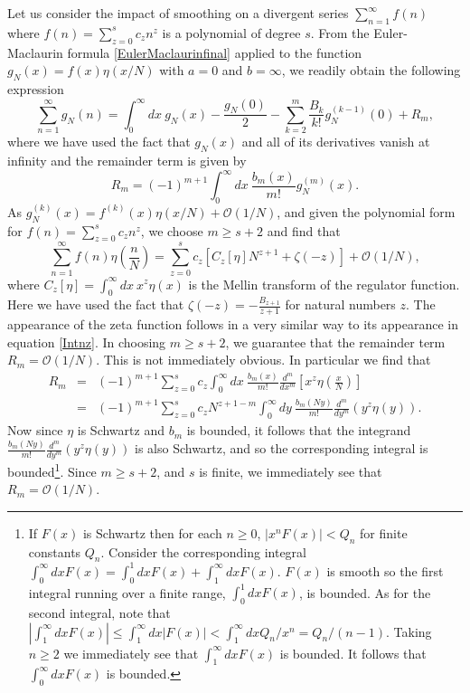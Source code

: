 \documentclass[11pt, letter]{article}
\def\be{\begin{equation}}
\def\ee{\end{equation}}
\begin{document}
Let us consider the impact of smoothing on a divergent series $\sum_{n=1}^\infty f(n)$ where $f(n)=\sum_{z=0}^s c_z n^z$ is a polynomial of degree  $s$. From the Euler-Maclaurin formula \eqref{EulerMaclaurinfinal} applied to the function $g_N(x)=f(x)\eta(x/N)$ with $a=0$ and $b=\infty$, we readily obtain the following expression
\begin{equation}\label{EM}
\sum_{n=1}^\infty g_N(n)= \int^\infty_0 dx \ g_N(x) - \frac{g_N(0)}{2}- \sum \limits_{k=2}^{m}  \frac{B_{k}}{k!} g_N^{(k-1)} (0)+ R_m,
\end{equation}
where we have used the fact that $g_N(x)$ and all of its derivatives vanish at infinity and the remainder term is given by 
\be
R_m= (-1)^{m+1} \int^\infty_0 dx \ \frac{b_{m}(x)}{m!} g_N^{(m)}(x).
\ee
As $g_N^{(k)}(x)=f^{(k)}(x)\eta(x/N)+\mathcal{O}(1/N)$, and given the polynomial form for $f(n)=\sum_{z=0}^s c_z n^z$, we choose $m \geq s+2$ and find that
\begin{equation}\label{EM2}
\sum_{n=1}^\infty f(n)\eta\left(\frac{n}{N}\right)= \sum_{z=0}^s c_z \left[C_{z}[\eta]   N^{z+1} +\zeta(-z)\right]+\mathcal{O}(1/N),
\end{equation}
where  $C_{z}[\eta] =\int_0^\infty dx  \ x^z \eta(x)$ is the Mellin transform of the regulator function. Here we have used the fact that $\zeta(-z)=-\frac{B_{z+1}}{z+1}$ for natural numbers $z$. The appearance of the zeta function follows in a very similar way to its appearance in equation \eqref{Intnz}. In choosing $m \geq s+2$, we guarantee that the remainder term $R_m =\mathcal{O}(1/N)$.  This is not immediately obvious. In particular we find that 
\begin{eqnarray}
R_{m} &=& (-1)^{m+1}  \sum_{z=0}^s c_z  \int^\infty_0 dx \ \frac{b_{m}(x)}{m!} \frac{d^m}{d x^m} \left[  x^z   \eta\left(\frac{x}{N}\right)\right] \\
&=& (-1)^{m+1}  \sum_{z=0}^s c_z  N^{z+1-m} \int^\infty_0 dy \ \frac{b_{m}(Ny)}{m!} \frac{d^m}{d y^m} (  y^z   \eta\left(y\right)).
\end{eqnarray}
Now since $\eta$ is Schwartz and $b_m$ is  bounded, it follows that the integrand $\frac{b_{m}(Ny)}{m!} \frac{d^m}{d y^m} (  y^z   \eta\left(y\right))$ is also Schwartz, and so the corresponding integral is bounded\footnote{If $F(x)$ is Schwartz then for each $n\geq 0$,  $|x^n F(x)|<Q_{n}$ for finite constants $Q_n$. Consider the corresponding integral $\int_0^\infty dx F(x)= \int_0^1dx F(x) +\int_1^\infty dx F(x)$. $F(x)$ is smooth so the first integral running over a finite range, $ \int_0^1dx F(x) $,  is bounded. As for the second integral, note that $\left| \int_1^\infty dx F(x)\right| \leq \int_1^\infty dx |F(x)| < \int_1^\infty dx Q_n/x^n=Q_n/(n-1)$.  Taking $n \geq 2$ we immediately see that  $\int_1^\infty dx F(x)$ is bounded. It follows that  $\int_0^\infty dx F(x)$ is bounded.}. Since $m \geq s+2$, and $s$ is finite,  we immediately see that $R_m =\mathcal{O}(1/N)$.
\end{document}
